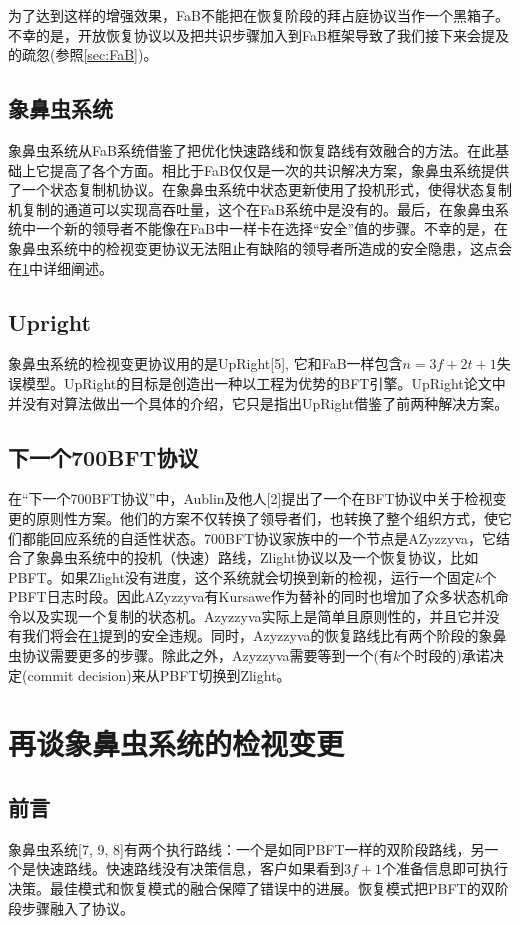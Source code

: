 \documentclass[UTF8]{ctexart}
\begin{document}
为了达到这样的增强效果，FaB不能把在恢复阶段的拜占庭协议当作一个黑箱子。不幸的是，开放恢复协议以及把共识步骤加入到FaB框架导致了我们接下来会提及的疏忽(参照\cref{sec:FaB})。

\subsection*{象鼻虫系统}
象鼻虫系统从FaB系统借鉴了把优化快速路线和恢复路线有效融合的方法。在此基础上它提高了各个方面。相比于FaB仅仅是一次的共识解决方案，象鼻虫系统提供了一个状态复制机协议。在象鼻虫系统中状态更新使用了投机形式，使得状态复制机复制的通道可以实现高吞吐量，这个在FaB系统中是没有的。最后，在象鼻虫系统中一个新的领导者不能像在FaB中一样卡在选择“安全”值的步骤。不幸的是，在象鼻虫系统中的检视变更协议无法阻止有缺陷的领导者所造成的安全隐患，这点会在\cref{sec:Zyzzyva}中详细阐述。

\subsection*{Upright}
象鼻虫系统的检视变更协议用的是UpRight[5], 它和FaB一样包含$n = 3f + 2t + 1$失误模型。UpRight的目标是创造出一种以工程为优势的BFT引擎。UpRight论文中并没有对算法做出一个具体的介绍，它只是指出UpRight借鉴了前两种解决方案。

\subsection*{下一个700BFT协议}
在“下一个700BFT协议”中，Aublin及他人[2]提出了一个在BFT协议中关于检视变更的原则性方案。他们的方案不仅转换了领导者们，也转换了整个组织方式，使它们都能回应系统的自适性状态。700BFT协议家族中的一个节点是AZyzzyva，它结合了象鼻虫系统中的投机（快速）路线，Zlight协议以及一个恢复协议，比如PBFT。如果Zlight没有进度，这个系统就会切换到新的检视，运行一个固定$k$个PBFT日志时段。因此AZyzzyva有Kursawe作为替补的同时也增加了众多状态机命令以及实现一个复制的状态机。Azyzzyva实际上是简单且原则性的，并且它并没有我们将会在\cref{sec:Zyzzyva}提到的安全违规。同时，Azyzzyva的恢复路线比有两个阶段的象鼻虫协议需要更多的步骤。除此之外，Azyzzyva需要等到一个(有$k$个时段的)承诺决定(commit decision)来从PBFT切换到Zlight。

\section{再谈象鼻虫系统的检视变更}\label{sec:Zyzzyva}
\subsection{前言}
象鼻虫系统[7, 9, 8]有两个执行路线：一个是如同PBFT一样的双阶段路线，另一个是快速路线。快速路线没有决策信息，客户如果看到$3f + 1$个准备信息即可执行决策。最佳模式和恢复模式的融合保障了错误中的进展。恢复模式把PBFT的双阶段步骤融入了协议。
\end{document}
